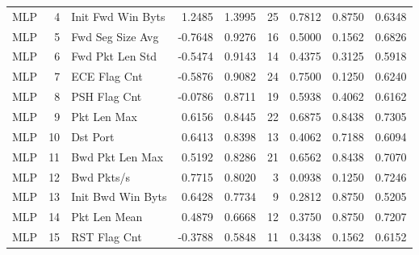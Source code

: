 \begin{table}
\begin{tabular}{lrlrrrrrr}
MLP & 4 & Init Fwd Win Byts & 1.2485 & 1.3995 & 25 & 0.7812 & 0.8750 & 0.6348 \\
MLP & 5 & Fwd Seg Size Avg & -0.7648 & 0.9276 & 16 & 0.5000 & 0.1562 & 0.6826 \\
MLP & 6 & Fwd Pkt Len Std & -0.5474 & 0.9143 & 14 & 0.4375 & 0.3125 & 0.5918 \\
MLP & 7 & ECE Flag Cnt & -0.5876 & 0.9082 & 24 & 0.7500 & 0.1250 & 0.6240 \\
MLP & 8 & PSH Flag Cnt & -0.0786 & 0.8711 & 19 & 0.5938 & 0.4062 & 0.6162 \\
MLP & 9 & Pkt Len Max & 0.6156 & 0.8445 & 22 & 0.6875 & 0.8438 & 0.7305 \\
MLP & 10 & Dst Port & 0.6413 & 0.8398 & 13 & 0.4062 & 0.7188 & 0.6094 \\
MLP & 11 & Bwd Pkt Len Max & 0.5192 & 0.8286 & 21 & 0.6562 & 0.8438 & 0.7070 \\
MLP & 12 & Bwd Pkts/s & 0.7715 & 0.8020 & 3 & 0.0938 & 0.1250 & 0.7246 \\
MLP & 13 & Init Bwd Win Byts & 0.6428 & 0.7734 & 9 & 0.2812 & 0.8750 & 0.5205 \\
MLP & 14 & Pkt Len Mean & 0.4879 & 0.6668 & 12 & 0.3750 & 0.8750 & 0.7207 \\
MLP & 15 & RST Flag Cnt & -0.3788 & 0.5848 & 11 & 0.3438 & 0.1562 & 0.6152 \\
\bottomrule
\end{tabular}
\end{table}
